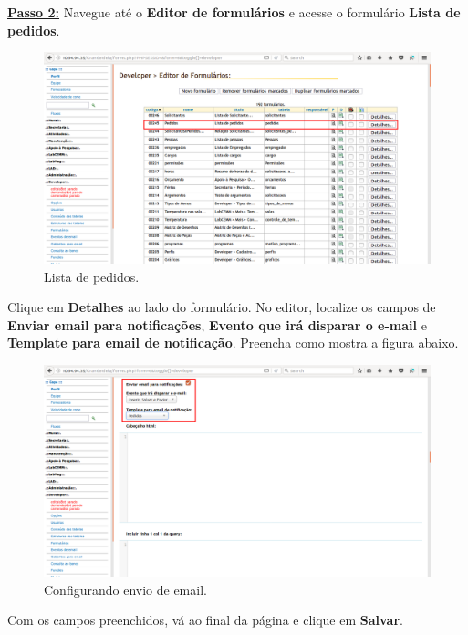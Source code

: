 \documentclass[9pt]{report}
\begin{document}
{      \underline{\textbf{Passo 2:}} Navegue até o \textbf{Editor de formulários} e acesse o formulário \textbf{Lista de pedidos}.

      \begin{figure}[H]
        \includegraphics[width=\textwidth]{2_Formularios/6_Envio_de_email/63.png}
        \caption{Lista de pedidos.}
        \label{fig:listapedidosgabarito}
      \end{figure}

      Clique em \textbf{Detalhes} ao lado do formulário. No editor,
      localize os campos de \textbf{Enviar email para notificações},
      \textbf{Evento que irá disparar o e-mail} e
      \textbf{Template para email de notificação}. Preencha como
      mostra a figura abaixo.

      \begin{figure}[H]
        \includegraphics[width=\textwidth]{2_Formularios/6_Envio_de_email/64.png}
        \caption{Configurando envio de email.}
        \label{fig:configenvioemail}
      \end{figure}

      Com os campos preenchidos, vá ao final da página e clique em
      \textbf{Salvar}.

}
\end{document}
